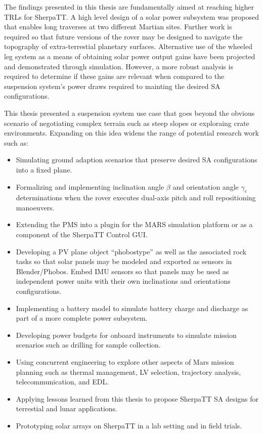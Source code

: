 The findings presented in this thesis are fundamentally aimed at reaching higher \acp{TRL} for SherpaTT. A high level design of a solar power subsystem was proposed that enables long traverses at two different Martian sites. Further work is required so that future versions of the rover may be designed to navigate the topography of extra-terrestial planetary surfaces. Alternative use of the wheeled leg system as a means of obtaining solar power output gains have been projected and demonstrated through simulation. However, a more robust analysis is required to determine if these gains are relevant when compared to the suspension system's power draws required to mainting the desired \ac{SA} configurations.

This thesis presented a suspension system use case that goes beyond the obvious scenario of negotiating complex terrain such as steep slopes or exploraing crate environments. Expanding on this idea widens the range of potential research work such as:

\begin{itemize}
  \item Simulating ground adaption scenarios that preserve desired \ac{SA} configurations into a fixed plane.
  \item Formalizing and implementing  inclination angle $\beta$ and orientation angle $\gamma_{c}$ determinations when the rover executes dual-axis pitch and roll repositioning manoeuvers.
  \item Extending the \ac{PMS} into a plugin for the MARS simulation platform or as a component of the SherpaTT Control GUI.
  \item Developing a \ac{PV} plane object ``phobostype'' as well as the associated rock tasks so that solar panels may be modeled and exported as sensors in Blender/Phobos. Embed \ac{IMU} sensors so that panels may be used as independent power units with their own inclinations and orientations configurations.
  \item Implementing a battery model to simulate battery charge and discharge as part of a more complete power subsystem.
  \item Developing power budgets for onboard instruments to simulate mission scenarios such as drilling for sample collection.
  \item Using concurrent engineering to explore other aspects of Mars mission planning such as thermal management, \ac{LV} selection, trajectory analysis, telecommunication, and \ac{EDL}.
  \item Applying lessons learned from this thesis to propose SherpaTT \ac{SA} designs for terrestial and lunar applications.
  \item Prototyping solar arrays on SherpaTT in a lab setting and in field trials.
\end{itemize}
